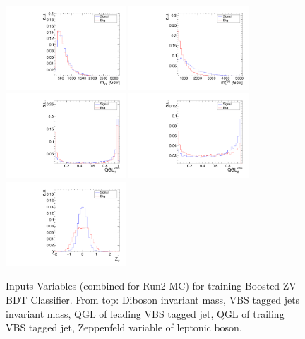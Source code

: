 \begin{figure}[!ht]
  \centering
  \includegraphics[width=0.4\textwidth]{analysis_plots/tmva_plots/zv_BDTG14_dibos_m.pdf}
  \includegraphics[width=0.4\textwidth]{analysis_plots/tmva_plots/zv_BDTG14_vbf_m.pdf} \\
  \includegraphics[width=0.4\textwidth]{analysis_plots/tmva_plots/zv_BDTG14_vbf1_AK4_qgid.pdf}
  \includegraphics[width=0.4\textwidth]{analysis_plots/tmva_plots/zv_BDTG14_vbf2_AK4_qgid.pdf} \\
  \includegraphics[width=0.4\textwidth]{analysis_plots/tmva_plots/zv_BDTG14_zeppLep_deta.pdf}
  \caption[Inputs Variables for training Boosted ZV BDT Classifier]%
  {Inputs Variables (combined for Run2 MC) for training Boosted ZV BDT Classifier.
    From top: Diboson invariant mass, VBS tagged jets invariant mass, \gls{QGL} of leading
    VBS tagged jet, \gls{QGL} of trailing VBS tagged jet, Zeppenfeld variable of leptonic boson.}%
  \label{fig:vbs-training-input-zv}
\end{figure}


